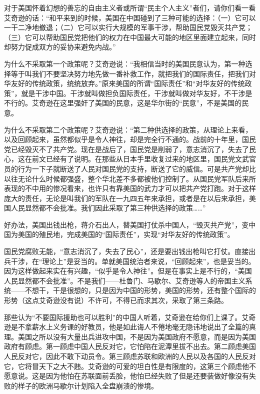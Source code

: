 对于美国怀着幻想的善忘的自由主义者或所谓“民主个人主义”者们，请你们看一看艾奇逊的话：“和平来到的时候，美国在中国碰到了三种可能的选择：（一）它可以一干二净地撤退；（二）它可以实行大规模的军事干涉，帮助国民党毁灭共产党；（三）它可以帮助国民党把他们的权力在中国最大可能的地区里面建立起来，同时却努力促成双方的妥协来避免内战。”

为什么不采取第一个政策呢？艾奇逊说：“我相信当时的美国民意认为，第一种选择等于叫我们不要坚决努力地先做一番补救工作，就把我们的国际责任，把我们对华友好的传统政策，统统放弃。”原来美国的所谓“国际责任”和“对华友好的传统政策”，就是干涉中国。干涉就叫做担负国际责任，干涉就叫做对华友好，不干涉是不行的。艾奇逊在这里强奸了美国的民意，这是华尔街的“民意”，不是美国的民意。

为什么不采取第二个政策呢？艾奇逊说：“第二种供选择的政策，从理论上来看，以及回顾起来，虽然都似乎是令人神往，却是完全行不通的。战前的十年里，国民党已经毁灭不了共产党。现在是战后了，国民党是削弱了，意志消沉了，失去了民心，这在前文已经有了说明。在那些从日本手里收复过来的地区里，国民党文武官员的行为一下子就断送了人民对国民党的支持，断送了它的威信。可是共产党却比以往无论什么时候都强盛，整个华北差不多都被他们控制了。从国民党军队后来所表现的不中用的惨况看来，也许只有靠美国的武力才可以把共产党打跑。对于这样庞大的责任，无论是叫我们的军队在一九四五年来承担，或者是在以后来承担，美国人民显然都不会批准。我们因此采取了第三种供选择的政策……”

好办法，美国出钱出枪，蒋介石出人，替美国打仗杀中国人，“毁灭共产党”，变中国为美国的殖民地，完成美国的“国际责任”，实现“对华友好的传统政策”。

国民党腐败无能，“意志消沉了，失去了民心”，还是要出钱出枪叫它打仗。直接出兵干涉，在“理论上”是妥当的。单就美国统治者来说，“回顾起来”，也是妥当的。因为这样做起来实在有兴趣，“似乎是令人神往”。但是在事实上是不行的，“美国人民显然都不会批准”。不是我们——杜鲁门、马歇尔、艾奇逊等人的帝国主义系统——不想干，干是很想的，只是因为中国的形势，美国的形势，还有整个国际的形势（这点艾奇逊没有说）不许可，不得已而求其次，采取了第三条路。

那些认为“不要国际援助也可以胜利”的中国人听着，艾奇逊在给你们上课了。艾奇逊是不拿薪水上义务课的好教员，他是如此诲人不倦地毫无隐讳地说出了全篇的真理。美国之所以没有大量出兵进攻中国，不是因为美国政府不愿意，而是因为美国政府有顾虑。第一顾虑中国人民反对它，它怕陷在泥潭里拔不出去。第二顾虑美国人民反对它，因此不敢下动员令。第三顾虑苏联和欧洲的人民以及各国的人民反对它，它将冒天下之大不韪。艾奇逊的可爱的坦白性是有限度的，这第三个顾虑他不愿意说。这是因为他怕在苏联面前丢脸，他怕已经失败了但是还要装做好像没有失败的样子的欧洲马歇尔计划陷入全盘崩溃的惨境。


